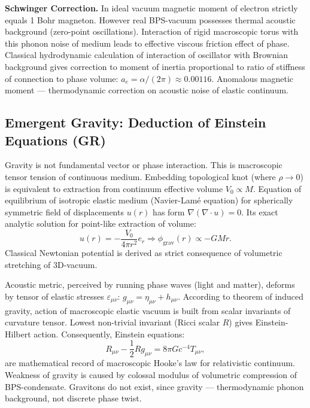 \documentclass[12pt,a4paper]{article}
\begin{document}
\textbf{Schwinger Correction.} In ideal vacuum magnetic moment of electron strictly equals 1 Bohr magneton. However real BPS-vacuum possesses thermal acoustic background (zero-point oscillations). Interaction of rigid macroscopic torus with this phonon noise of medium leads to effective viscous friction effect of phase. Classical hydrodynamic calculation of interaction of oscillator with Brownian background gives correction to moment of inertia proportional to ratio of stiffness of connection to phase volume: $a_e = \alpha/(2\pi) \approx 0.00116$. Anomalous magnetic moment --- thermodynamic correction on acoustic noise of elastic continuum.

\subsection{Emergent Gravity: Deduction of Einstein Equations (GR)}
Gravity is not fundamental vector or phase interaction. This is macroscopic tensor tension of continuous medium. Embedding topological knot (where $\rho \to 0$) is equivalent to extraction from continuum effective volume $V_0 \propto M$. Equation of equilibrium of isotropic elastic medium (Navier-Lamé equation) for spherically symmetric field of displacements $u(r)$ has form $\nabla(\nabla \cdot u) = 0$. Its exact analytic solution for point-like extraction of volume:
\begin{equation}
    u(r) = -\frac{V_0}{4\pi r^2} e_r \Rightarrow \phi_{\text{grav}}(r) \propto -GMr.
    \label{eq:gravity_potential}
\end{equation}
Classical Newtonian potential is derived as strict consequence of volumetric stretching of 3D-vacuum.

Acoustic metric, perceived by running phase waves (light and matter), deforms by tensor of elastic stresses $\varepsilon_{\mu\nu}$: $g_{\mu\nu} = \eta_{\mu\nu} + h_{\mu\nu}$. According to theorem of induced gravity, action of macroscopic elastic vacuum is built from scalar invariants of curvature tensor. Lowest non-trivial invariant (Ricci scalar $R$) gives Einstein-Hilbert action. Consequently, Einstein equations:
\begin{equation}
    R_{\mu\nu} - \frac{1}{2}R g_{\mu\nu} = 8\pi G c^{-4} T_{\mu\nu},
    \label{eq:einstein_equations}
\end{equation}
are mathematical record of macroscopic Hooke's law for relativistic continuum. Weakness of gravity is caused by colossal modulus of volumetric compression of BPS-condensate. Gravitons do not exist, since gravity --- thermodynamic phonon background, not discrete phase twist.
\end{document}

